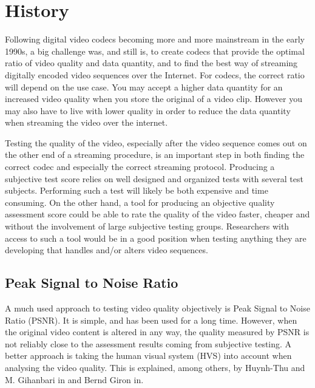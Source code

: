 \section{History}\label{sect:history}

Following digital video codecs becoming more and more mainstream in the early 1990s, a big challenge was, and still is, to create codecs that provide the optimal ratio of video quality and data quantity, and to find the best way of streaming digitally encoded video sequences over the Internet. For codecs, the correct ratio will depend on the use case. You may accept a higher data quantity for an increased video quality when you store the original of a video clip. However you may also have to live with lower quality in order to reduce the data quantity when streaming the video over the internet. 

Testing the quality of the video, especially after the video sequence comes out on the other end of a streaming procedure, is an important step in both finding the correct codec and especially the correct streaming protocol. Producing a subjective test score relies on well designed and organized tests with several test subjects. Performing such a test will likely be both expensive and time consuming. On the other hand, a tool for producing an objective quality assessment score could be able to rate the quality of the video faster, cheaper and without the involvement of large subjective testing groups. Researchers with access to such a tool would be in a good position when testing anything they are developing that handles and\slash or alters video sequences.

\subsection{Peak Signal to Noise Ratio}\label{sect:psnr}
A much used approach to testing video quality objectively is Peak Signal to Noise Ratio (PSNR). It is simple, and has been used for a long time. However, when the original video content is altered in any way, the quality measured by PSNR is not reliably close to the assessment results coming from subjective testing. A better approach is taking the human visual system (HVS) into account when analysing the video quality. This is explained, among others, by Huynh-Thu and M. Gihanbari in \cite{4550695} and Bernd Giron in\cite{Girod:1993:WWM:197765.197784}.

